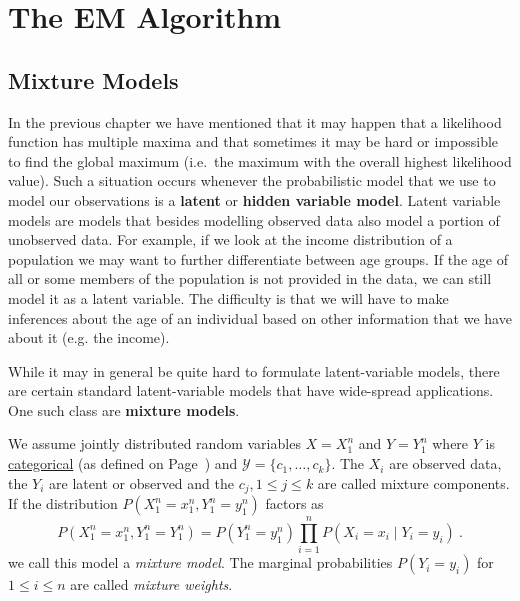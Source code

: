 

\chapter{The EM Algorithm}

\section{Mixture Models}\label{sec:mixtureModels}

In the previous chapter we have mentioned that it may happen that a likelihood function has multiple 
maxima and that sometimes it may be hard or impossible to find the global maximum (i.e.\ the maximum
with the overall highest likelihood value). Such a situation occurs whenever the probabilistic model
that we use to model our observations is a \textbf{latent} or \textbf{hidden variable model}. Latent variable
models are models that besides modelling observed data also model a portion of unobserved data. For
example, if we look at the income distribution of a population we may want to further differentiate
between age groups. If the age of all or some members of the population is not provided in the data, we
can still model it as a latent variable. The difficulty is that we will have to make inferences about the
age of an individual based on other information that we have about it (e.g. the income). 

While it may in general be quite hard to formulate latent-variable models, there are certain standard
latent-variable models that have wide-spread applications. One such class are \textbf{mixture models}.

\begin{Definition}\label{def:mixtureModel}
We assume jointly distributed random variables $ X=X_{1}^{n} $ and $
Y=Y_{1}^{n} $ where $ Y $ is \href{https://en.wikipedia.org/wiki/Categorical_variable}{categorical} (as defined on Page~\pageref{lab:categorical}) and
$ \mathcal{Y} = \{c_{1}, \ldots, c_{k}\} $. The $ X_{i} $ are observed data, the $ Y_{i} $ are latent
or observed and the $ c_{j}, 1\leq j \leq k $ are called mixture components. 
If the distribution
$ P(X_{1}^{n}=x_{1}^{n}, Y_{1}^{n} = y_{1}^{n}) $ factors as
$$ P(X_{1}^{n}=x_{1}^{n}, Y_{1}^{n} = Y_{1}^{n})= P(Y_{1}^{n} = y_{1}^{n}) \prod_{i=1}^{n} P(X_{i}=x_{i} \mid Y_{i} = y_{i}) \ . $$
we call this model a \emph{mixture model}. The marginal probabilities $ P(Y_{i}=y_{i}) $ for $ 1 \leq i \leq n $ are called
\emph{mixture weights}.
\end{Definition}

